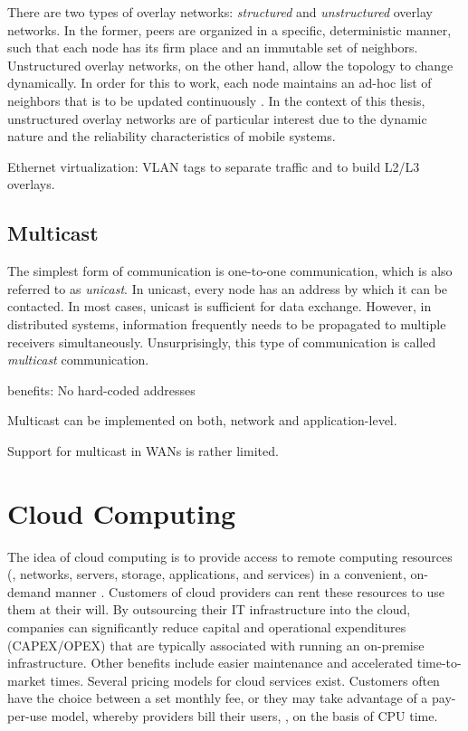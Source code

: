 There are two types of overlay networks: \emph{structured} and \emph{unstructured} overlay networks. In the former, peers are organized in a specific, deterministic manner, such that each node has its firm place and an immutable set of neighbors. Unstructured overlay networks, on the other hand, allow the topology to change dynamically. In order for this to work, each node maintains an ad-hoc list of neighbors that is to be updated continuously \cite{tanenbaum2017distributed}. In the context of this thesis, unstructured overlay networks are of particular interest due to the dynamic nature and the reliability characteristics of mobile systems.


Ethernet virtualization: VLAN tags to separate traffic and to build L2/L3 overlays.


\subsection{Multicast}
The simplest form of communication is one-to-one communication, which is also referred to as \emph{unicast}. In unicast, every node has an address by which it can be contacted. In most cases, unicast is sufficient for data exchange. However, in distributed systems, information frequently needs to be propagated to multiple receivers simultaneously. Unsurprisingly, this type of communication is called \emph{multicast} communication. 

benefits: No hard-coded addresses

Multicast can be implemented on both, network and application-level.

Support for multicast in WANs is rather limited.

%
%
%
%
%
%
%
%
%
%

\section{Cloud Computing}

The idea of cloud computing is to provide access to remote computing resources  (\eg , networks, servers, storage, applications, and services) in a convenient, on-demand manner \cite{mell2011nist}. Customers of cloud providers can rent these resources to use them at their will. By outsourcing their IT infrastructure into the cloud, companies can significantly reduce capital and operational expenditures (CAPEX/OPEX) that are typically associated with running an on-premise infrastructure. Other benefits include easier maintenance and accelerated time-to-market times. Several pricing models for cloud services exist. Customers often have the choice between a set monthly fee, or they may take advantage of a pay-per-use model, whereby providers bill their users, \eg , on the basis of CPU time.

